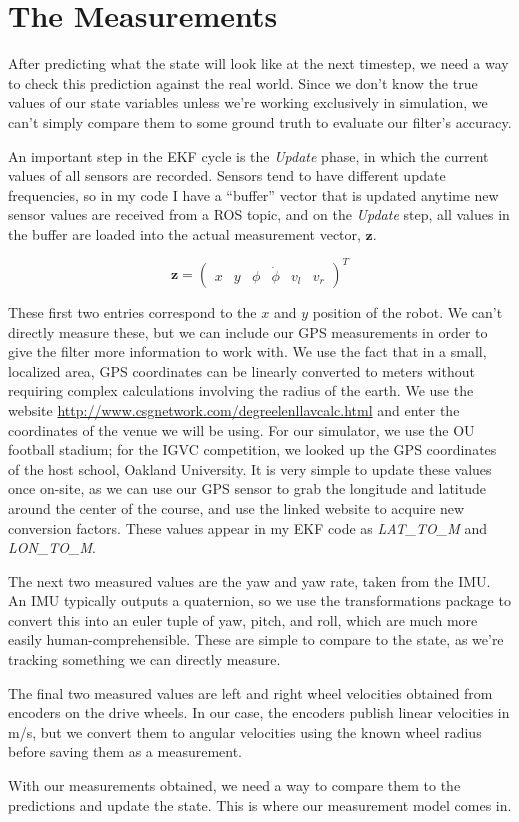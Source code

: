 \section{The Measurements}

After predicting what the state will look like at the next timestep, we need a way to check this prediction against the real world. Since we don't know the true values of our state variables unless we're working exclusively in simulation, we can't simply compare them to some ground truth to evaluate our filter's accuracy. 

An important step in the EKF cycle is the \textit{Update} phase, in which the current values of all sensors are recorded. Sensors tend to have different update frequencies, so in my code I have a ``buffer'' vector that is updated anytime new sensor values are received from a ROS topic, and on the \textit{Update} step, all values in the buffer are loaded into the actual measurement vector, $\boldsymbol{z}$.

\begin{equation}
    \boldsymbol{z} = 
    \begin{pmatrix}
    x & y & \phi & \dot{\phi} & v_l & v_r
    \end{pmatrix} ^T
\end{equation}

These first two entries correspond to the $x$ and $y$ position of the robot. We can't directly measure these, but we can include our GPS measurements in order to give the filter more information to work with. We use the fact that in a small, localized area, GPS coordinates can be linearly converted to meters without requiring complex calculations involving the radius of the earth. We use the website \url{http://www.csgnetwork.com/degreelenllavcalc.html} and enter the coordinates of the venue we will be using. For our simulator, we use the OU football stadium; for the IGVC competition, we looked up the GPS coordinates of the host school, Oakland University. It is very simple to update these values once on-site, as we can use our GPS sensor to grab the longitude and latitude around the center of the course, and use the linked website to acquire new conversion factors. These values appear in my EKF code as \textit{LAT\_TO\_M} and \textit{LON\_TO\_M}. 

The next two measured values are the yaw and yaw rate, taken from the IMU. An IMU typically outputs a quaternion, so we use the transformations package to convert this into an euler tuple of yaw, pitch, and roll, which are much more easily human-comprehensible. These are simple to compare to the state, as we're tracking something we can directly measure.

The final two measured values are left and right wheel velocities obtained from encoders on the drive wheels. In our case, the encoders publish linear velocities in m/s, but we convert them to angular velocities using the known wheel radius before saving them as a measurement.

With our measurements obtained, we need a way to compare them to the predictions and update the state. This is where our measurement model comes in.
